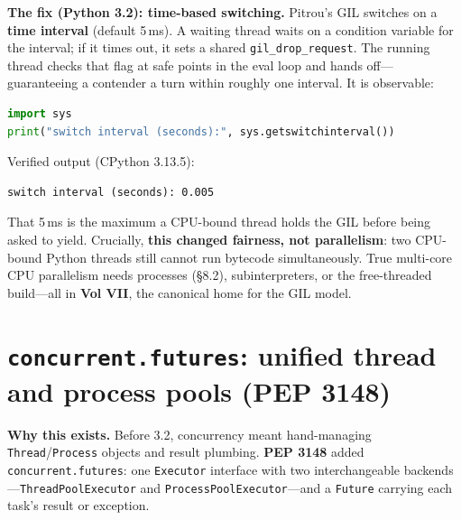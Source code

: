 \textbf{The fix (Python 3.2): time-based switching.} Pitrou's GIL switches on a \textbf{time
interval} (default 5\,ms). A waiting thread waits on a condition variable for the interval; if it
times out, it sets a shared \texttt{gil\_drop\_request}. The running thread checks that flag at
safe points in the eval loop and hands off---guaranteeing a contender a turn within roughly one
interval. It is observable:

\begin{lstlisting}[language=Python, caption={The new GIL switches on time, not bytecode count.}]
import sys
print("switch interval (seconds):", sys.getswitchinterval())
\end{lstlisting}

Verified output (CPython 3.13.5):

\begin{lstlisting}[caption={Output}]
switch interval (seconds): 0.005
\end{lstlisting}

That 5\,ms is the maximum a CPU-bound thread holds the GIL before being asked to yield.
Crucially, \textbf{this changed fairness, not parallelism}: two CPU-bound Python threads still
cannot run bytecode simultaneously. True multi-core CPU parallelism needs processes (§8.2),
subinterpreters, or the free-threaded build---all in \textbf{Vol VII}, the canonical home for the
GIL model.

\section{\texttt{concurrent.futures}: unified thread and process pools (PEP 3148)}

\textbf{Why this exists.} Before 3.2, concurrency meant hand-managing \texttt{Thread}/\texttt{Process}
objects and result plumbing. \textbf{PEP 3148} added \texttt{concurrent.futures}: one
\texttt{Executor} interface with two interchangeable backends---\texttt{ThreadPoolExecutor} and
\texttt{ProcessPoolExecutor}---and a \texttt{Future} carrying each task's result or exception.

